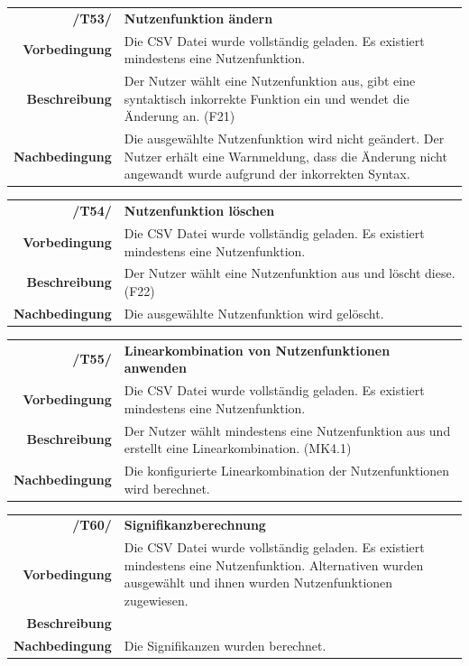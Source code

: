 \documentclass{article}
\begin{document}
\begin{table}[H]
\begin{tabularx}{\textwidth}{rX}
\textbf{/T53/}         & \textbf{Nutzenfunktion ändern} \\
\textbf{Vorbedingung}  & Die CSV Datei wurde vollständig geladen. Es existiert mindestens eine Nutzenfunktion.   \\
\textbf{Beschreibung}  & Der Nutzer wählt eine Nutzenfunktion aus, gibt eine syntaktisch inkorrekte Funktion ein und wendet die Änderung an. (F21) \\
\textbf{Nachbedingung} & Die ausgewählte Nutzenfunktion wird nicht geändert. Der Nutzer erhält eine Warnmeldung, dass die Änderung nicht angewandt wurde aufgrund der inkorrekten Syntax.
\end{tabularx}
\end{table}

\begin{table}[H]
\begin{tabularx}{\textwidth}{rX}
\textbf{/T54/}         & \textbf{Nutzenfunktion löschen} \\
\textbf{Vorbedingung}  & Die CSV Datei wurde vollständig geladen. Es existiert mindestens eine Nutzenfunktion.  \\
\textbf{Beschreibung}  & Der Nutzer wählt eine Nutzenfunktion aus und löscht diese. (F22) \\
\textbf{Nachbedingung} & Die ausgewählte Nutzenfunktion wird gelöscht.
\end{tabularx}
\end{table}

\begin{table}[H]
\begin{tabularx}{\textwidth}{rX}
\textbf{/T55/}         & \textbf{Linearkombination von Nutzenfunktionen anwenden} \\
\textbf{Vorbedingung}  & Die CSV Datei wurde vollständig geladen. Es existiert mindestens eine Nutzenfunktion.  \\
\textbf{Beschreibung}  & Der Nutzer wählt mindestens eine Nutzenfunktion aus und erstellt eine Linearkombination. (MK4.1) \\
\textbf{Nachbedingung} & Die konfigurierte Linearkombination der Nutzenfunktionen wird berechnet.
\end{tabularx}
\end{table}

\begin{table}[H]
\begin{tabularx}{\textwidth}{rX}
\textbf{/T60/}         & \textbf{Signifikanzberechnung} \\
\textbf{Vorbedingung}  & Die CSV Datei wurde vollständig geladen. Es existiert mindestens eine Nutzenfunktion. Alternativen wurden ausgewählt und ihnen wurden Nutzenfunktionen zugewiesen. \\
\textbf{Beschreibung}  &  \\
\textbf{Nachbedingung} & Die Signifikanzen wurden berechnet.
\end{tabularx}
\end{table}
\end{document}
